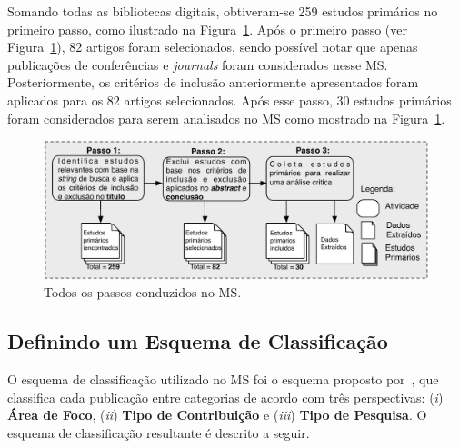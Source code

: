 Somando todas as bibliotecas digitais, obtiveram-se 259 estudos primários no primeiro passo, como ilustrado na Figura~\ref{fig:todos_os_passos}. Após o primeiro passo (ver Figura~\ref{fig:todos_os_passos}), 82 artigos foram selecionados, sendo possível notar que apenas publicações de conferências e \textit{journals} foram considerados nesse MS. Posteriormente, os critérios de inclusão anteriormente apresentados foram aplicados para os 82 artigos selecionados. Após esse passo, 30 estudos primários foram considerados para serem analisados no MS como mostrado na Figura~\ref{fig:todos_os_passos}.

\begin{figure}[h]
 \caption{Todos os passos conduzidos no MS.}
 \label{fig:todos_os_passos}
 \centering
 \includegraphics[scale=0.7]{images/todosOsPassosMS}
 \fautor
\end{figure}

\subsection{Definindo um Esquema de Classificação}\label{subsec:definindo_esquema_de_classificacao}

O esquema de classificação utilizado no MS foi o esquema proposto por~, que classifica cada publicação entre categorias de acordo com três perspectivas: (\textit{i}) \textbf{Área de Foco}, (\textit{ii}) \textbf{Tipo de Contribuição} e (\textit{iii}) \textbf{Tipo de Pesquisa}. O esquema de classificação resultante é descrito a seguir.

